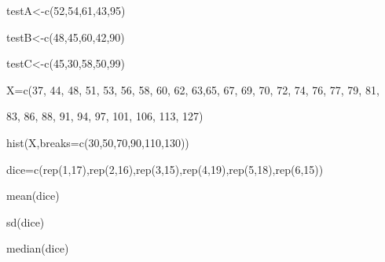 

testA<-c(52,54,61,43,95)

testB<-c(48,45,60,42,90)

testC<-c(45,30,58,50,99)



 

X=c(37, 44, 48, 51, 53, 56, 58, 60, 62, 63,65, 67, 69, 70, 72, 74, 76, 77, 79, 81,

83, 86, 88, 91, 94, 97, 101, 106, 113, 127)


hist(X,breaks=c(30,50,70,90,110,130))

 


dice=c(rep(1,17),rep(2,16),rep(3,15),rep(4,19),rep(5,18),rep(6,15))

mean(dice)

sd(dice)

median(dice)



 

 

